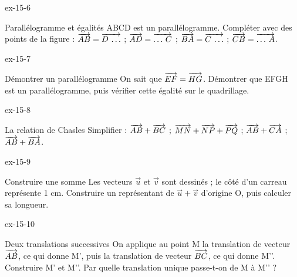 \clearpage{}
\begin{blocLivre}{ex-15-6}\begin{exercice}[2]{Parallélogramme et égalités}
ABCD est un parallélogramme. Compléter avec des points de la figure : $\overrightarrow{AB}=\overrightarrow{D\,\ldots}$ ; $\overrightarrow{AD}=\overrightarrow{\ldots\,C}$ ; $\overrightarrow{BA}=\overrightarrow{C\,\ldots}$ ; $\overrightarrow{CB}=\overrightarrow{\ldots\,A}$.
\label{fig-ex-15-6}
\end{exercice}\end{blocLivre}
\begin{blocLivre}{ex-15-7}\begin{exercice}[2]{Démontrer un parallélogramme}
On sait que $\overrightarrow{EF}=\overrightarrow{HG}$. Démontrer que EFGH est un parallélogramme, puis vérifier cette égalité sur le quadrillage.
\label{fig-ex-15-7}
\end{exercice}\end{blocLivre}
\begin{blocLivre}{ex-15-8}\begin{exercice}[2]{La relation de Chasles}
Simplifier : $\overrightarrow{AB}+\overrightarrow{BC}$ ; $\overrightarrow{MN}+\overrightarrow{NP}+\overrightarrow{PQ}$ ; $\overrightarrow{AB}+\overrightarrow{CA}$ ; $\overrightarrow{AB}+\overrightarrow{BA}$.
\label{fig-ex-15-8}
\end{exercice}\end{blocLivre}
\begin{blocLivre}{ex-15-9}\begin{exercice}[2]{Construire une somme}
Les vecteurs $\vec u$ et $\vec v$ sont dessinés ; le côté d’un carreau représente 1 cm. Construire un représentant de $\vec u+\vec v$ d’origine O, puis calculer sa longueur.
\label{fig-ex-15-9}
\end{exercice}\end{blocLivre}
\begin{blocLivre}{ex-15-10}\begin{exercice}[2]{Deux translations successives}
On applique au point M la translation de vecteur $\overrightarrow{AB}$, ce qui donne M’, puis la translation de vecteur $\overrightarrow{BC}$, ce qui donne M’’. Construire M’ et M’’. Par quelle translation unique passe-t-on de M à M’’ ?
\label{fig-ex-15-10}
\end{exercice}\end{blocLivre}


